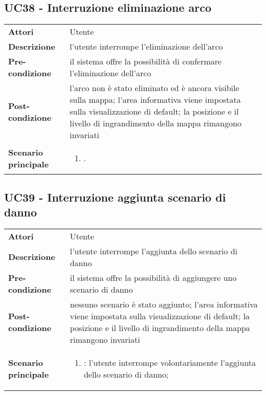 \subsection{UC38 - Interruzione eliminazione arco} 
\label{sssec:UC38} 
\def\arraystretch{1.5}
\begin{tabularx}{\textwidth}{l|p{}}
	\rowcolor{I} \multicolumn{2}{c}{\color{white}\textbf{UC38 - Interruzione eliminazione arco}} \\
	\toprule
	\endhead
	\textbf{Attori} & Utente\\
	\textbf{Descrizione} & l'utente interrompe l'eliminazione dell'arco\\
	\textbf{Pre-condizione} & il sistema offre la possibilità di confermare l'eliminazione dell'arco\\
	\textbf{Post-condizione} & l'arco non è stato eliminato ed è ancora visibile sulla mappa; l'area informativa viene impostata sulla visualizzazione di default;  la posizione e il livello di ingrandimento della mappa rimangono invariati\\
	\textbf{Scenario principale} & \vspace{-1.2em}\begin{enumerate}[leftmargin=*,noitemsep,nosep]
		\item \nameref{sssec:UC38}.
	\end{enumerate}\\
	\bottomrule
\end{tabularx}
\subsection{UC39 - Interruzione aggiunta scenario di danno} 
\label{sssec:UC39} 
\def\arraystretch{1.5}
\begin{tabularx}{\textwidth}{l|p{}}
	\rowcolor{I} \multicolumn{2}{c}{\color{white}\textbf{UC39 - Interruzione aggiunta scenario di danno}} \\
	\toprule
	\endhead
	\textbf{Attori} & Utente\\
	\textbf{Descrizione} & l'utente interrompe l'aggiunta dello scenario di danno\\
	\textbf{Pre-condizione} & il sistema offre la possibilità di aggiungere uno scenario di danno\\
	\textbf{Post-condizione} & nessuno scenario è stato aggiunto; l'area informativa viene impostata sulla visualizzazione di default; la posizione e il livello di ingrandimento della mappa rimangono invariati\\
	\textbf{Scenario principale} & \vspace{-1.2em}\begin{enumerate}[leftmargin=*,noitemsep,nosep]
		\item \nameref{sssec:UC39}: l’utente interrompe volontariamente l’aggiunta dello
		scenario di danno;
	\end{enumerate}\\
	\bottomrule
\end{tabularx}

